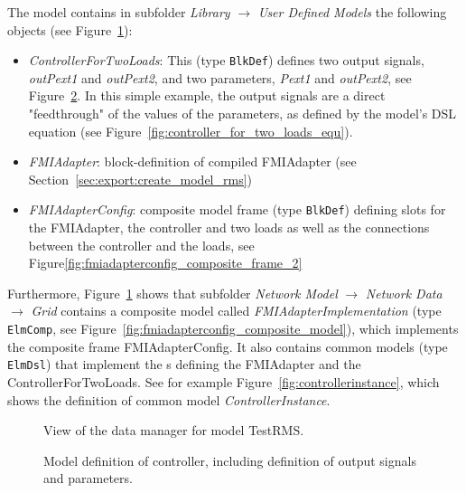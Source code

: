 The \pf model contains in subfolder \emph{Library} $\to$ \emph{User Defined Models} the following objects (see Figure~\ref{fig:example_rms_model_browser}):
\begin{itemize}
  \item \emph{ControllerForTwoLoads}: This \dslmodel (type \texttt{BlkDef}) defines two output signals, \emph{outPext1} and \emph{outPext2}, and two parameters, \emph{Pext1} and \emph{outPext2}, see Figure~\ref{fig:controller_for_two_loads}.
  In this simple example, the output signals are a direct "feedthrough" of the values of the parameters, as defined by the model's DSL equation (see Figure~\ref{fig:controller_for_two_loads_equ}).
  \item \emph{FMIAdapter}: block-definition of compiled \dslmodel FMIAdapter (see Section~\ref{sec:export:create_model_rms})
  \item \emph{FMIAdapterConfig}: composite model frame (type \texttt{BlkDef}) defining slots for the FMIAdapter, the controller and two loads as well as the connections between the controller and the loads, see Figure\ref{fig:fmiadapterconfig_composite_frame_2}
\end{itemize}

Furthermore, Figure~\ref{fig:example_rms_model_browser} shows that subfolder \emph{Network Model} $\to$ \emph{Network Data} $\to$ \emph{Grid} contains a composite model called \emph{FMIAdapterImplementation} (type \texttt{ElmComp}, see Figure~\ref{fig:fmiadapterconfig_composite_model}), which implements the composite frame FMIAdapterConfig.
It also contains common models (type \texttt{ElmDsl}) that implement the {\dslmodel}s defining the FMIAdapter and the ControllerForTwoLoads.
See for example Figure~\ref{fig:controllerinstance}, which shows the definition of common model \emph{ControllerInstance}.

\begin{figure}[h!]
\caption{View of the data manager for \pf model TestRMS.}
\label{fig:example_rms_model_browser}
\end{figure}

\begin{figure}[h!]
\vspace*{1em}
\caption{Model definition of controller, including definition of output signals and parameters.}
\label{fig:controller_for_two_loads}
\end{figure}

